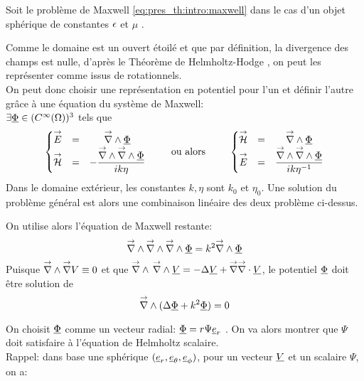 Soit le problème de Maxwell \eqref{eq:pres_th:intro:maxwell} dans le cas d'un objet sphérique de constantes $\epsilon$ et $\mu$%
.

Comme le domaine est un ouvert étoilé et que par définition, la divergence des champs est nulle, d'après le Théorème de Helmholtz-Hodge \cite{gui_rigorous_2007}, on peut les représenter comme issus de rotationnels.\\
On peut donc choisir une représentation en potentiel pour l'un et définir l'autre grâce à une équation du système de Maxwell:\\
 $\exists \underline{\Phi} \in (C^\infty(\Omega))^3$ tels que
\begin{equation}
  \label{eq:sol_maxwell:pot_hertz}
  \left\lbrace\begin{matrix}
    {\overset{\rightarrow}{E}} &=& {\overset{\rightarrow}{\nabla}}\wedge \underline{\Phi} \\
    {\overset{\rightarrow}{\mathcal{H}}} &=& - \dfrac{{\overset{\rightarrow}{\nabla}}\wedge {\overset{\rightarrow}{\nabla}}\wedge \underline{\Phi}}{ik\eta}
  \end{matrix} \right.
  \qquad \text{ ou alors } \qquad
  \left\lbrace\begin{matrix}
    {\overset{\rightarrow}{\mathcal{H}}} &=& {\overset{\rightarrow}{\nabla}}\wedge \underline{\Phi}\\
    {\overset{\rightarrow}{E}} &=& \dfrac{{\overset{\rightarrow}{\nabla}}\wedge {\overset{\rightarrow}{\nabla}}\wedge \underline{\Phi}}{ik\eta^{-1}}\\
  \end{matrix}\right.
\end{equation}
Dans le domaine extérieur, les constantes $k,\eta$ sont $k_0$ et $\eta_0$. Une solution du problème général est alors une combinaison linéaire des deux problème ci-dessus.

On utilise alors l'équation de Maxwell restante:
\[
    {\overset{\rightarrow}{\nabla}}\wedge {\overset{\rightarrow}{\nabla}}\wedge {\overset{\rightarrow}{\nabla}}\wedge \underline{\Phi} = k^2 {\overset{\rightarrow}{\nabla}}\wedge \underline{\Phi}
\]
Puisque ${\overset{\rightarrow}{\nabla}}\wedge  {\overset{\rightarrow}{\nabla}}  V  \equiv 0$ et que ${\overset{\rightarrow}{\nabla}}\wedge\, {\overset{\rightarrow}{\nabla}}\wedge \underline{V} = -\Delta \underline{V} + {\overset{\rightarrow}{\nabla}} {\overset{\rightarrow}{\nabla}}\cdot \underline{V}$, le potentiel $\underline{\Phi}$ doit être solution de 
\begin{equation}
  \label{eq:sol_maxwell:helmholtz_vect}
  {\overset{\rightarrow}{\nabla}}\wedge ( \Delta \underline{\Phi} + k^2 \underline{\Phi} ) = 0
\end{equation}

On choisit $\underline{\Phi}$ comme un vecteur radial: $\underline{\Phi} = r \Psi \underline{e}_r$ \cite[p.~84]{bohren_absorption_2004}. On va alors montrer que $\Psi$ doit satisfaire à l'équation de Helmholtz scalaire.\\

Rappel: dans base une sphérique $(\underline{e}_r, \underline{e}_\theta, \underline{e}_\phi)$, pour 
un vecteur $\underline{V}$ 
et un scalaire $\Psi$, on a:

